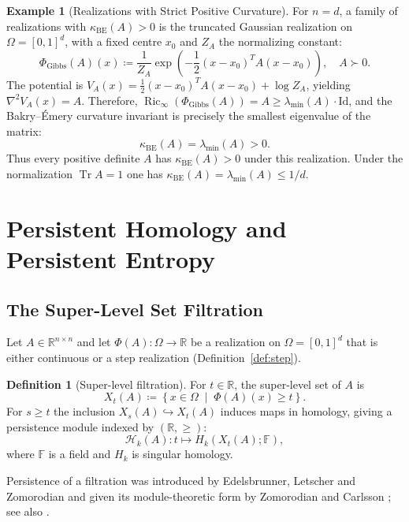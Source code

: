 \documentclass[11pt,a4paper,reqno]{amsart}
\theoremstyle{definition}
\newtheorem{definition}[theorem]{Definition}
\newtheorem{example}[theorem]{Example}
\numberwithin{equation}{section}
\newcommand{\R}{\mathbb{R}}
\newcommand{\Id}{\mathrm{Id}}
\newcommand{\Tr}{\operatorname{Tr}}
\newcommand{\Ric}{\operatorname{Ric}}
\begin{document}
\begin{example}[Realizations with Strict Positive Curvature]
\label{ex:positive_curvature}
For $n = d$, a family of realizations with $\kappa_{\mathrm{BE}}(A) > 0$ is the truncated Gaussian realization on $\Omega = [0, 1]^d$, with a fixed centre $x_0$ and $Z_A$ the normalizing constant:
\begin{equation}
    \Phi_{\mathrm{Gibbs}}(A)(x) \coloneqq \frac{1}{Z_A} \exp\left( -\frac{1}{2} (x - x_0)^T A (x - x_0) \right), \quad A \succ 0.
\end{equation}
The potential is $V_A(x) = \frac{1}{2} (x - x_0)^T A (x - x_0) + \log Z_A$, yielding $\nabla^2 V_A(x) = A$. Therefore, $\Ric_\infty(\Phi_{\mathrm{Gibbs}}(A)) = A \ge \lambda_{\min}(A) \cdot \Id$, and the Bakry--\'Emery curvature invariant is precisely the smallest eigenvalue of the matrix:
\begin{equation}
    \kappa_{\mathrm{BE}}(A) = \lambda_{\min}(A) > 0.
\end{equation}
Thus every positive definite $A$ has $\kappa_{\mathrm{BE}}(A) > 0$ under this realization. Under the normalization $\Tr A = 1$ one has $\kappa_{\mathrm{BE}}(A) = \lambda_{\min}(A) \le 1/d$.
\end{example}

\section{Persistent Homology and Persistent Entropy}
\label{sec:persistent_homology}

\subsection{The Super-Level Set Filtration}
Let $A \in \R^{n \times n}$ and let $\Phi(A) \colon \Omega \to \R$ be a realization on $\Omega = [0, 1]^d$ that is either continuous or a step realization (Definition~\ref{def:step}).

\begin{definition}[Super-level filtration]
For $t \in \R$, the super-level set of $A$ is
\begin{equation}
    X_t(A) \coloneqq \left\{ x \in \Omega \;\middle|\; \Phi(A)(x) \ge t \right\}.
\end{equation}
For $s \ge t$ the inclusion $X_s(A) \hookrightarrow X_t(A)$ induces maps in homology, giving a persistence module indexed by $(\R, \ge)$:
\begin{equation}
    \mathcal{H}_k(A) \colon t \longmapsto H_k(X_t(A); \mathbb{F}),
\end{equation}
where $\mathbb{F}$ is a field and $H_k$ is singular homology.
\end{definition}
Persistence of a filtration was introduced by Edelsbrunner, Letscher and Zomorodian \cite{edelsbrunner2002topological} and given its module-theoretic form by Zomorodian and Carlsson \cite{zomorodian2005computing}; see also \cite{edelsbrunner2010computational}.
\end{document}
